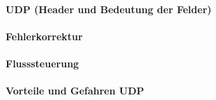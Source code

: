 \documentclass[a4paper,12pt]{article}
\begin{document}
\paragraph{UDP (Header und Bedeutung der Felder)}

\paragraph{Fehlerkorrektur}

\paragraph{Flusssteuerung}

\paragraph{Vorteile und Gefahren UDP}











\section{}
\end{document}
